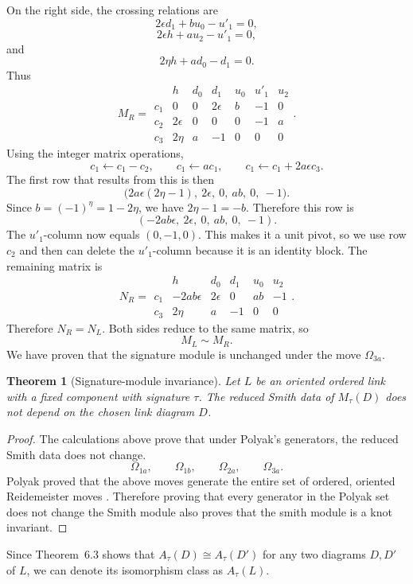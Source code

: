 \documentclass[11pt]{article}
\newtheorem{theorem}{Theorem}[section]
\theoremstyle{definition}
\begin{document}
On the right side, the crossing relations are
\[
2\epsilon d_1+bu_0-u'_1=0,
\]
\[
2\epsilon h+au_2-u'_1=0,
\]
and
\[
2\eta h+ad_0-d_1=0.
\]
Thus
\[
M_R=
\begin{array}{c|cccccc}
&h&d_0&d_1&u_0&u'_1&u_2\\ \hline
c_1&0&0&2\epsilon&b&-1&0\\
c_2&2\epsilon&0&0&0&-1&a\\
c_3&2\eta&a&-1&0&0&0
\end{array}.
\]
Using the integer matrix operations,
\[
c_1\leftarrow c_1-c_2,
\qquad
c_1\leftarrow ac_1,
\qquad
c_1\leftarrow c_1+2a\epsilon c_3.
\]
The first row that results from this is then
\[
\bigl(2a\epsilon(2\eta-1),\ 2\epsilon,\ 0,\ ab,\ 0,\ -1\bigr).
\]
Since $b=(-1)^\eta=1-2\eta$, we have $2\eta-1=-b$. Therefore this row is
\[
(-2ab\epsilon,\ 2\epsilon,\ 0,\ ab,\ 0,\ -1).
\]
The $u'_1$-column now equals $(0,-1,0)$. This makes it a unit pivot, so we use row $c_2$ and then can delete the $u'_1$-column because it is an identity block. The remaining matrix is
\[
N_R=
\begin{array}{c|ccccc}
&h&d_0&d_1&u_0&u_2\\ \hline
c_1&-2ab\epsilon&2\epsilon&0&ab&-1\\
c_3&2\eta&a&-1&0&0
\end{array}.
\]
Therefore $N_R=N_L$. Both sides reduce to the same matrix, so
\[
M_L\sim M_R.
\]
We have proven that the signature module is unchanged under the move $\Omega_{3a}$.

\begin{theorem}[Signature-module invariance]
Let $L$ be an oriented ordered link with a fixed component with signature $\tau$. The reduced Smith data of $M_\tau(D)$ does not depend on the chosen link diagram $D$.
\end{theorem}

\begin{proof}
The calculations above prove that under Polyak's generators, the reduced Smith data does not change.
\[
\Omega_{1a},
\qquad
\Omega_{1b},
\qquad
\Omega_{2a},
\qquad
\Omega_{3a}.
\]
Polyak proved that the above moves generate the entire set of ordered, oriented Reidemeister moves \cite[Theorem~1.1]{polyak}. Therefore proving that every generator in the Polyak set does not change the Smith module also proves that the smith module is a knot invariant.
\end{proof}

Since Theorem~6.3 shows that $A_\tau(D)\cong A_\tau(D')$ for any two diagrams $D,D'$ of $L$, we can denote its isomorphism class as $A_\tau(L)$.
\end{document}
